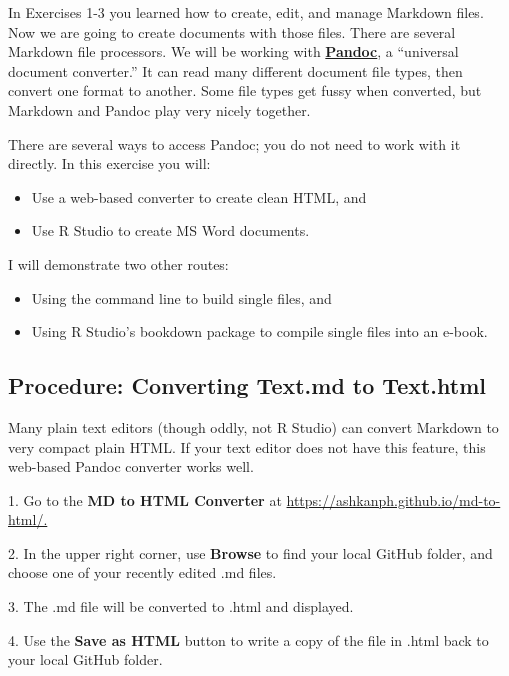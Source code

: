 \documentclass[
]{article}
\providecommand{\tightlist}{%
  \setlength{\itemsep}{0pt}\setlength{\parskip}{0pt}}
\begin{document}
In Exercises 1-3 you learned how to create, edit, and manage Markdown
files. Now we are going to create documents with those files. There are
several Markdown file processors. We will be working with
\href{https://pandoc.org/index.html}{\textbf{Pandoc}}, a ``universal
document converter.'' It can read many different document file types,
then convert one format to another. Some file types get fussy when
converted, but Markdown and Pandoc play very nicely together.

There are several ways to access Pandoc; you do not need to work with it
directly. In this exercise you will:

\begin{itemize}
\tightlist
\item
  Use a web-based converter to create clean HTML, and
\item
  Use R Studio to create MS Word documents.
\end{itemize}

I will demonstrate two other routes:

\begin{itemize}
\tightlist
\item
  Using the command line to build single files, and
\item
  Using R Studio's bookdown package to compile single files into an
  e-book.
\end{itemize}

\hypertarget{procedure-converting-text.md-to-text.html}{%
\subsection{Procedure: Converting Text.md to
Text.html}\label{procedure-converting-text.md-to-text.html}}

Many plain text editors (though oddly, not R Studio) can convert
Markdown to very compact plain HTML. If your text editor does not have
this feature, this web-based Pandoc converter works well.

1. Go to the \textbf{MD to HTML Converter} at
\href{https://ashkanph.github.io/md-to-html/}{https://ashkanph.github.io/md-to-html/.}

2. In the upper right corner, use \textbf{Browse} to find your local
GitHub folder, and choose one of your recently edited .md files.

3. The .md file will be converted to .html and displayed.

4. Use the \textbf{Save as HTML} button to write a copy of the file in
.html back to your local GitHub folder.
\end{document}
